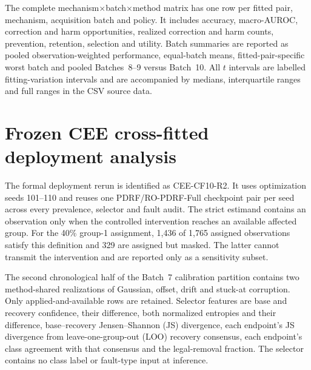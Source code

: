 \documentclass[10pt]{article}
\begin{document}
The complete mechanism$\times$batch$\times$method matrix has one row per fitted pair, mechanism, acquisition batch and policy. It includes accuracy, macro-AUROC, correction and harm opportunities, realized correction and harm counts, prevention, retention, selection and utility. Batch summaries are reported as pooled observation-weighted performance, equal-batch means, fitted-pair-specific worst batch and pooled Batches~8--9 versus Batch~10. All $t$ intervals are labelled fitting-variation intervals and are accompanied by medians, interquartile ranges and full ranges in the CSV source data.

\section{Frozen CEE cross-fitted deployment analysis}

The formal deployment rerun is identified as CEE-CF10-R2. It uses optimization seeds 101--110 and reuses one PDRF/RO-PDRF-Full checkpoint pair per seed across every prevalence, selector and fault audit. The strict estimand contains an observation only when the controlled intervention reaches an available affected group. For the 40\% group-1 assignment, 1,436 of 1,765 assigned observations satisfy this definition and 329 are assigned but masked. The latter cannot transmit the intervention and are reported only as a sensitivity subset.

\begin{table}[ht]
\centering
\caption{Frozen run manifest. The test realization, temperature protocol, checkpoint pair and selector protocol are common to all CEE-CF10-R2 headline tables.}
\resizebox{0.84\textwidth}{!}{}
\end{table}

\begin{table}[ht]
\centering
\caption{Strict fault-applied-and-available macro-AUROC means $\pm$ standard deviations across 10 matched optimization seeds. Each mechanism contains 1,436 observations per seed.}
\resizebox{\textwidth}{!}{}
\end{table}

The second chronological half of the Batch~7 calibration partition contains two method-shared realizations of Gaussian, offset, drift and stuck-at corruption. Only applied-and-available rows are retained. Selector features are base and recovery confidence, their difference, both normalized entropies and their difference, base--recovery Jensen--Shannon (JS) divergence, each endpoint's JS divergence from leave-one-group-out (LOO) recovery consensus, each endpoint's class agreement with that consensus and the legal-removal fraction. The selector contains no class label or fault-type input at inference.
\end{document}
